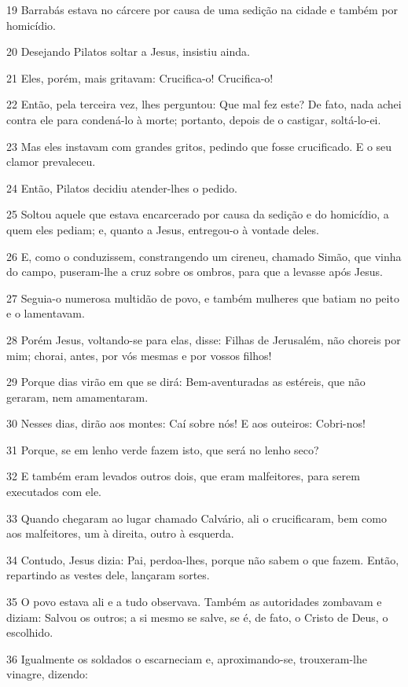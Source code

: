 \par 19 Barrabás estava no cárcere por causa de uma sedição na cidade e também por homicídio.
\par 20 Desejando Pilatos soltar a Jesus, insistiu ainda.
\par 21 Eles, porém, mais gritavam: Crucifica-o! Crucifica-o!
\par 22 Então, pela terceira vez, lhes perguntou: Que mal fez este? De fato, nada achei contra ele para condená-lo à morte; portanto, depois de o castigar, soltá-lo-ei.
\par 23 Mas eles instavam com grandes gritos, pedindo que fosse crucificado. E o seu clamor prevaleceu.
\par 24 Então, Pilatos decidiu atender-lhes o pedido.
\par 25 Soltou aquele que estava encarcerado por causa da sedição e do homicídio, a quem eles pediam; e, quanto a Jesus, entregou-o à vontade deles.
\par 26 E, como o conduzissem, constrangendo um cireneu, chamado Simão, que vinha do campo, puseram-lhe a cruz sobre os ombros, para que a levasse após Jesus.
\par 27 Seguia-o numerosa multidão de povo, e também mulheres que batiam no peito e o lamentavam.
\par 28 Porém Jesus, voltando-se para elas, disse: Filhas de Jerusalém, não choreis por mim; chorai, antes, por vós mesmas e por vossos filhos!
\par 29 Porque dias virão em que se dirá: Bem-aventuradas as estéreis, que não geraram, nem amamentaram.
\par 30 Nesses dias, dirão aos montes: Caí sobre nós! E aos outeiros: Cobri-nos!
\par 31 Porque, se em lenho verde fazem isto, que será no lenho seco?
\par 32 E também eram levados outros dois, que eram malfeitores, para serem executados com ele.
\par 33 Quando chegaram ao lugar chamado Calvário, ali o crucificaram, bem como aos malfeitores, um à direita, outro à esquerda.
\par 34 Contudo, Jesus dizia: Pai, perdoa-lhes, porque não sabem o que fazem. Então, repartindo as vestes dele, lançaram sortes.
\par 35 O povo estava ali e a tudo observava. Também as autoridades zombavam e diziam: Salvou os outros; a si mesmo se salve, se é, de fato, o Cristo de Deus, o escolhido.
\par 36 Igualmente os soldados o escarneciam e, aproximando-se, trouxeram-lhe vinagre, dizendo:

